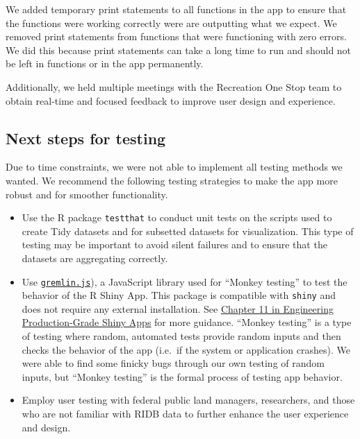 \documentclass[
  11 pt,
  openany]{book}
\providecommand{\tightlist}{%
  \setlength{\itemsep}{0pt}\setlength{\parskip}{0pt}}
\begin{document}
We added temporary print statements to all functions in the app to ensure that the functions were working correctly were are outputting what we expect. We removed print statements from functions that were functioning with zero errors. We did this because print statements can take a long time to run and should not be left in functions or in the app permanently.

Additionally, we held multiple meetings with the Recreation One Stop team to obtain real-time and focused feedback to improve user design and experience.

\hypertarget{next-steps-for-testing}{%
\subsection{Next steps for testing}\label{next-steps-for-testing}}

Due to time constraints, we were not able to implement all testing methods we wanted. We recommend the following testing strategies to make the app more robust and for smoother functionality.

\begin{itemize}
\tightlist
\item
  Use the R package \texttt{testthat} \citep{R-testthat} to conduct unit tests on the scripts used to create Tidy datasets and for subsetted datasets for visualization. This type of testing may be important to avoid silent failures and to ensure that the datasets are aggregating correctly.
\item
  Use \href{https://github.com/marmelab/gremlins.js}{\texttt{gremlin.js}}), a JavaScript library used for ``Monkey testing'' to test the behavior of the R Shiny App. This package is compatible with \texttt{shiny} \citep{R-shiny} and does not require any external installation. See \href{https://engineering-shiny.org/build-yourself-safety-net.html}{Chapter 11 in Engineering Production-Grade Shiny Apps} for more guidance. ``Monkey testing'' is a type of testing where random, automated tests provide random inputs and then checks the behavior of the app (i.e.~if the system or application crashes). We were able to find some finicky bugs through our own testing of random inputs, but ``Monkey testing'' is the formal process of testing app behavior.
\item
  Employ user testing with federal public land managers, researchers, and those who are not familiar with RIDB data to further enhance the user experience and design.
\end{itemize}
\end{document}
